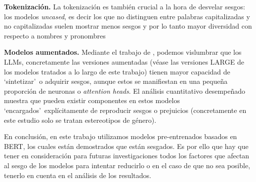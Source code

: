 \textbf{Tokenización.} La tokenización es también crucial a la hora de desvelar sesgos: los modelos \textit{uncased}, es decir los que no distinguen entre palabras capitalizadas y no capitalizadas suelen mostrar menos sesgos y por lo tanto mayor diversidad con respecto a nombres y pronombres \citep{Silva2021}

\textbf{Modelos aumentados.} Mediante el trabajo de \citet{Vig2020}, podemos vislumbrar que los LLMs, concretamente las versiones aumentadas (véase las versiones LARGE de los modelos tratados a lo largo de este trabajo) tienen mayor capacidad de `sintetizar'\ o adquirir sesgos, aunque estos se manifiestan en una pequeña proporción de neuronas o \textit{attention heads}. El análisis cuantitativo desempeñado muestra que pueden existir componentes en estos modelos `encargados'\ explícitamente de reproducir sesgos o prejuicios (concretamente en este estudio solo se tratan estereotipos de género).

En conclusión, en este trabajo utilizamos modelos pre-entrenados basados en BERT, los cuales están demostrados que están sesgados. Es por ello que hay que tener en consideración para futuras investigaciones todos los factores que afectan al sesgo de los modelos para intentar reducirlo o en el caso de que no sea posible, tenerlo en cuenta en el análisis de los resultados.